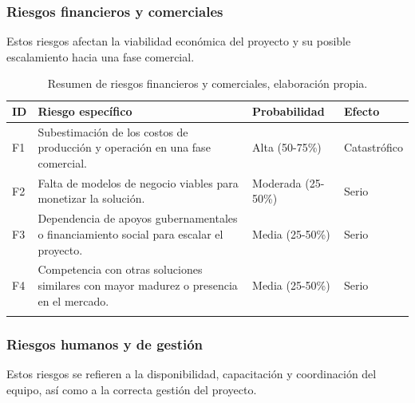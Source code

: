 \subsubsection{Riesgos financieros y comerciales}
Estos riesgos afectan la viabilidad económica del proyecto y su posible escalamiento hacia una fase comercial.

\setlength{\tabcolsep}{4pt}
\renewcommand{\arraystretch}{1.2}

\begin{longtable}{|>{\centering\arraybackslash}p{0.8cm}|>{\raggedright\arraybackslash}p{3.5cm}|>{\raggedright\arraybackslash}p{5.1cm}|>{\raggedright\arraybackslash}p{5.1cm}|}
	\hline
	\textbf{ID} & \textbf{Riesgo específico} & \textbf{Probabilidad} & \textbf{Efecto} \\
	\hline
	F1 & Subestimación de los costos de producción y operación en una fase comercial. & Alta (50-75\%) & Catastrófico \\
	\hline
	F2 & Falta de modelos de negocio viables para monetizar la solución. & Moderada (25-50\%) & Serio \\
	\hline
	F3 & Dependencia de apoyos gubernamentales o financiamiento social para escalar el proyecto. & Media (25-50\%) & Serio \\
	\hline
	F4 & Competencia con otras soluciones similares con mayor madurez o presencia en el mercado. & Media (25-50\%) & Serio \\
	\hline

\caption[Resumen de riesgos financieros y comerciales]{Resumen de riesgos financieros y comerciales, elaboración propia.} \label{tab:riesgos_financieros_resumen} \\
\end{longtable}

\subsubsection{Riesgos humanos y de gestión}
Estos riesgos se refieren a la disponibilidad, capacitación y coordinación del equipo, así como a la correcta gestión del proyecto.

\setlength{\tabcolsep}{4pt}
\renewcommand{\arraystretch}{1.2}

